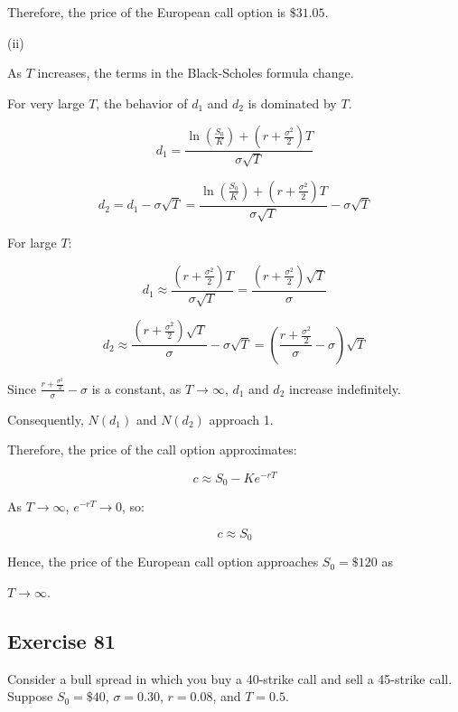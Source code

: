 \documentclass{article}
\begin{document}
Therefore, the price of the European call option is \( \boxed{\$31.05} \).

\vspace{\baselineskip}

(ii) 


As \( T \) increases, the terms in the Black-Scholes formula change. 

For very large \( T \), the behavior of \( d_1 \) and \( d_2 \) is dominated by \( T \).

\[
d_1 = \frac{\ln\left(\frac{S_0}{K}\right) + \left(r + \frac{\sigma^2}{2}\right)T}{\sigma \sqrt{T}}
\]

\[
d_2 = d_1 - \sigma \sqrt{T} = \frac{\ln\left(\frac{S_0}{K}\right) + \left(r + \frac{\sigma^2}{2}\right)T}{\sigma \sqrt{T}} - \sigma \sqrt{T}
\]

For large \( T \):

\[
d_1 \approx \frac{(r + \frac{\sigma^2}{2})T}{\sigma \sqrt{T}} = \frac{(r + \frac{\sigma^2}{2})\sqrt{T}}{\sigma}
\]

\[
d_2 \approx \frac{(r + \frac{\sigma^2}{2})\sqrt{T}}{\sigma} - \sigma \sqrt{T} = \left(\frac{r + \frac{\sigma^2}{2}}{\sigma} - \sigma\right) \sqrt{T}
\]

Since \( \frac{r + \frac{\sigma^2}{2}}{\sigma} - \sigma \) is a constant, as \( T \to \infty \), \( d_1 \) and \( d_2 \) increase indefinitely. 

\vspace{\baselineskip}

Consequently, \( N(d_1) \) and \( N(d_2) \) approach 1.

\vspace{\baselineskip}

Therefore, the price of the call option approximates:

\[
c \approx S_0 - K e^{-rT}
\]

As \( T \to \infty \), \( e^{-rT} \to 0 \), so:

\[
c \approx S_0
\]

Hence, the price of the European call option approaches \( S_0 = \$120 \) as 

\( T \to \infty \).

\subsection*{Exercise 81}

Consider a bull spread in which you buy a 40-strike call and sell a 45-strike call. Suppose \( S_0 = \$40 \), \( \sigma = 0.30 \), \( r = 0.08 \), and \( T = 0.5 \).
\end{document}

